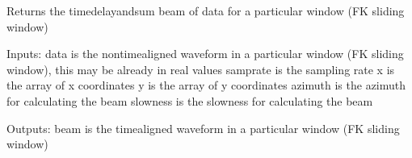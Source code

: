 \documentclass[letterpaper,10pt,english]{sphinxmanual}
\begin{document}
\begin{fulllineitems}
\label{\detokenize{infrapy.detection:infrapy.detection.beamforming.svdAV_wv}}
\end{fulllineitems}


\begin{fulllineitems}
\label{\detokenize{infrapy.detection:infrapy.detection.beamforming.tapering}}
\end{fulllineitems}


\begin{fulllineitems}
\label{\detokenize{infrapy.detection:infrapy.detection.beamforming.tdelay}}
Returns the time\sphinxhyphen{}delay\sphinxhyphen{}and\sphinxhyphen{}sum beam of data for a particular window (FK sliding window)

Inputs:
\sphinxhyphen{} data is the non\sphinxhyphen{}time\sphinxhyphen{}aligned waveform in a particular window (FK sliding window), this may be already in real values
\sphinxhyphen{} samprate is the sampling rate
\sphinxhyphen{} x is the array of x coordinates
\sphinxhyphen{} y is the array of y coordinates
\sphinxhyphen{} azimuth is the azimuth for calculating the beam
\sphinxhyphen{} slowness is the slowness for calculating the beam

Outputs:
\sphinxhyphen{} beam is the time\sphinxhyphen{}aligned waveform in a particular window (FK sliding window)

\end{fulllineitems}

\end{document}
